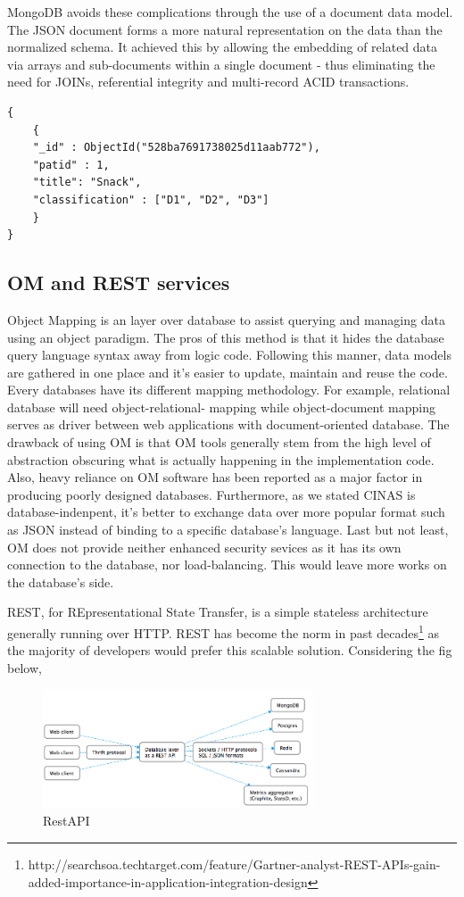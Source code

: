 \documentclass{sig-alternate}
\begin{document}
{MongoDB avoids these complications through the use of a document data model. The JSON document forms a more natural representation on the data than the normalized schema. It achieved this by allowing the embedding of related data via arrays and sub-documents within a single document - thus eliminating the need for JOINs, referential integrity and multi-record ACID transactions.

\begin{lstlisting}[caption=Json Example]
{
	{
	"_id" : ObjectId("528ba7691738025d11aab772"),
	"patid" : 1,
	"title": "Snack",
	"classification" : ["D1", "D2", "D3"]
	}
}
\end{lstlisting}

\subsection{OM and REST services}

Object Mapping is an layer over database to assist querying and managing data using an object paradigm. The pros of this method is that it hides the database query language syntax away from logic code. Following this manner, data models are gathered in one place and it's easier to update, maintain and reuse the code. Every databases have its different mapping methodology. For example, relational database will need object-relational- mapping while object-document mapping serves as driver between web applications with document-oriented database. The drawback of using OM is that OM tools generally stem from the high level of abstraction obscuring what is actually happening in the implementation code. Also, heavy reliance on OM software has been reported as a major factor in producing poorly designed databases. Furthermore, as we stated CINAS is database-indenpent, it's better to exchange data over more popular format such as JSON instead of binding to a specific database's language. Last but not least, OM does not provide neither enhanced security sevices as it has its own connection to the database, nor load-balancing. This would leave more works on the database's side.

REST, for REpresentational State Transfer, is a simple stateless architecture generally running over HTTP. REST has become the norm in past decades\footnote{http://searchsoa.techtarget.com/feature/Gartner-analyst-REST-APIs-gain-added-importance-in-application-integration-design
} as the majority of developers would prefer this scalable solution. Considering the fig below,
\begin{figure}[htb]
\centering
\includegraphics[width=80mm,scale=10]{restapi.png}
\caption{ RestAPI }
\end{figure}

}
\end{document}
